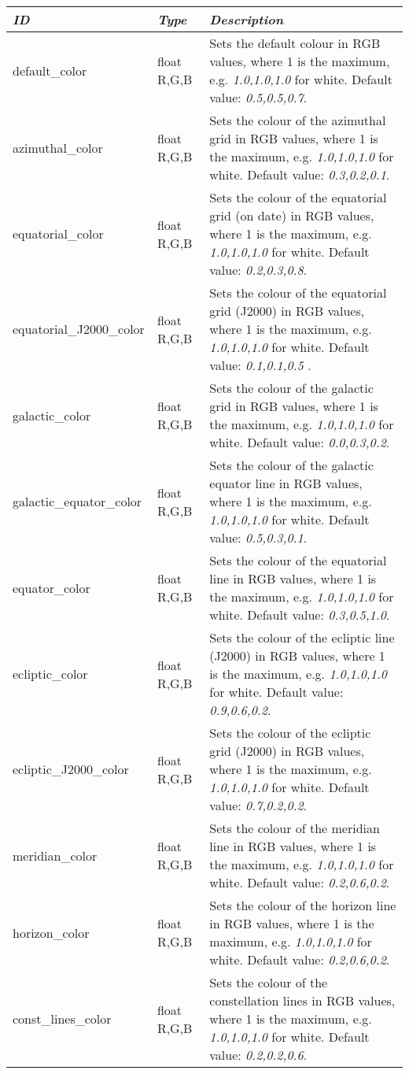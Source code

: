 \begin{longtabu} to \textwidth {l|l|X}
\toprule
\emph{ID} & \emph{Type} & \emph{Description}\tabularnewline
\midrule
default\_color & float R,G,B & Sets the default
colour in RGB values, where 1 is the maximum, e.g. \emph{1.0,1.0,1.0}
for white. Default value: \emph{0.5,0.5,0.7}. \tabularnewline
\midrule
azimuthal\_color & float R,G,B & Sets the
colour of the azimuthal grid in RGB values, where 1 is the maximum, e.g.
\emph{1.0,1.0,1.0} for white. Default value: \emph{0.3,0.2,0.1}.\tabularnewline
\midrule
equatorial\_color & float R,G,B & Sets the
colour of the equatorial grid (on date) in RGB values, where 1 is the
maximum, e.g. \emph{1.0,1.0,1.0} for white. Default value: \emph{0.2,0.3,0.8}.\tabularnewline
\midrule
equatorial\_J2000\_color & float R,G,B & Sets
the colour of the equatorial grid (J2000) in RGB values, where 1 is the
maximum, e.g. \emph{1.0,1.0,1.0} for white. Default value: \emph{0.1,0.1,0.5 }.\tabularnewline
\midrule
galactic\_color & float R,G,B & Sets the colour
of the galactic grid in RGB values, where 1 is the maximum, e.g.
\emph{1.0,1.0,1.0} for white. Default value: \emph{0.0,0.3,0.2}.\tabularnewline
\midrule
galactic\_equator\_color & float R,G,B & Sets the
colour of the galactic equator line in RGB values, where 1 is the
maximum, e.g. \emph{1.0,1.0,1.0} for white. Default value: \emph{0.5,0.3,0.1}. \tabularnewline
\midrule
equator\_color & float R,G,B & Sets the
colour of the equatorial line in RGB values, where 1 is the maximum,
e.g. \emph{1.0,1.0,1.0} for white. Default value: \emph{0.3,0.5,1.0}. \tabularnewline
\midrule
ecliptic\_color & float R,G,B & Sets the
colour of the ecliptic line (J2000) in RGB values, where 1 is the
maximum, e.g. \emph{1.0,1.0,1.0} for white. Default value: \emph{0.9,0.6,0.2}. \tabularnewline
\midrule
ecliptic\_J2000\_color & float R,G,B & Sets the
colour of the ecliptic grid (J2000) in RGB values, where 1 is the
maximum, e.g. \emph{1.0,1.0,1.0} for white. Default value: \emph{0.7,0.2,0.2}. \tabularnewline
\midrule
meridian\_color & float R,G,B & Sets the
colour of the meridian line in RGB values, where 1 is the maximum, e.g.
\emph{1.0,1.0,1.0} for white. Default value: \emph{0.2,0.6,0.2}. \tabularnewline
\midrule
horizon\_color & float R,G,B & Sets the colour
of the horizon line in RGB values, where 1 is the maximum, e.g.
\emph{1.0,1.0,1.0} for white. Default value: \emph{0.2,0.6,0.2}. \tabularnewline
\midrule
const\_lines\_color & float R,G,B & Sets the
colour of the constellation lines in RGB values, where 1 is the maximum,
e.g. \emph{1.0,1.0,1.0} for white. Default value: \emph{0.2,0.2,0.6}. \tabularnewline

\end{longtabu}
